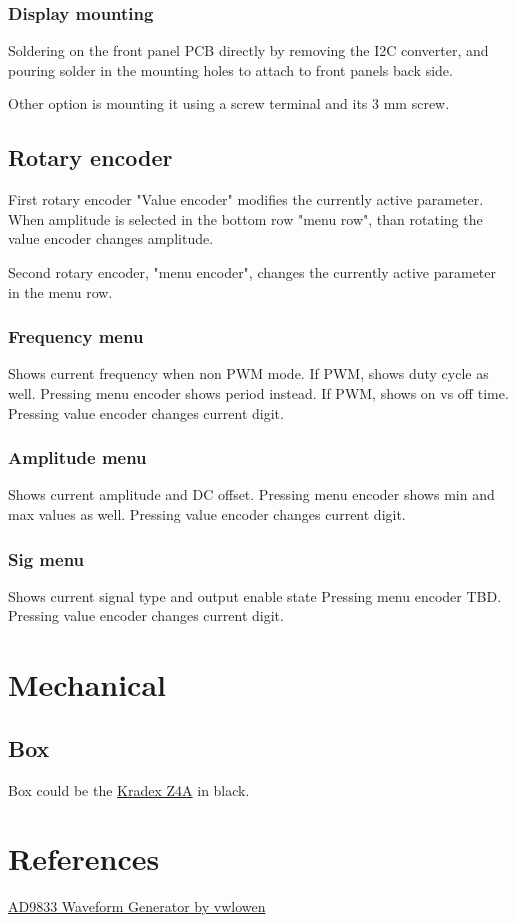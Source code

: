 \documentclass[11pt]{article}
\begin{document}
\subsubsection{Display mounting}
Soldering on the front panel PCB directly by removing the I2C converter, 
and pouring solder in the mounting holes to attach to front panels back side.

Other option is mounting it using a screw terminal and its 3 mm screw.

\subsection{Rotary encoder}
First rotary encoder "Value encoder" modifies the currently active parameter.
When amplitude is selected in the bottom row "menu row", than rotating the 
value encoder changes amplitude.

Second rotary encoder, "menu encoder", changes the currently active parameter
in the menu row.

\subsubsection{Frequency menu}
Shows current frequency when non PWM mode. If PWM, shows duty cycle as well.
Pressing menu encoder shows period instead. If PWM, shows on vs off time.
Pressing value encoder changes current digit.

\subsubsection{Amplitude menu}
Shows current amplitude and DC offset.
Pressing menu encoder shows min and max values as well.
Pressing value encoder changes current digit.

\subsubsection{Sig menu}
Shows current signal type and output enable state
Pressing menu encoder TBD.
Pressing value encoder changes current digit.

\pagebreak
\section{Mechanical}
\subsection{Box}
Box could be the \href{https://www.mgelectronic.rs/kutija-plasti%C4%8Dna-z4a-2}{Kradex Z4A} in black. 

\pagebreak
\section{References}
\href{http://www.vwlowen.co.uk/arduino/AD9833-waveform-generator/AD9833-waveform-generator.htm}{AD9833 Waveform Generator by vwlowen}
\end{document}
